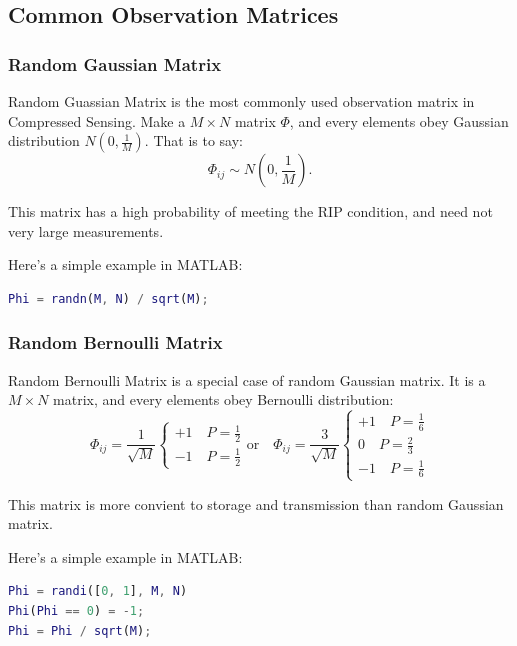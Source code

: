 \documentclass[12pt]{ctexart}
\begin{document}
\subsection{\textbf{Common Observation Matrices}}

\subsubsection{\textbf{Random Gaussian Matrix}}

Random Guassian Matrix is the most commonly used observation matrix in Compressed Sensing.
Make a $M \times N$ matrix $\Phi$, and every elements obey Gaussian distribution
$N (0,\frac{1}{M})$. That is to say:
\[
  \Phi_{ij} \sim N(0, \frac{1}{M}).
\]

This matrix has a high probability of meeting the RIP condition, and need not very large
measurements.

Here's a simple example in MATLAB:

\begin{lstlisting}[language=Matlab]
%% Random Gaussian Matrix Example
Phi = randn(M, N) / sqrt(M);
\end{lstlisting}

\subsubsection{\textbf{Random Bernoulli Matrix}}

Random Bernoulli Matrix is a special case of random Gaussian matrix. It is a $M \times N$
matrix, and every elements obey Bernoulli distribution:
\[
  \Phi_{ij} = \frac{1}{\sqrt{M}}
  \begin{cases}
    +1 \quad P=\tfrac12 \\
    -1 \quad P=\tfrac12
  \end{cases}
  \text{or} \quad
  \Phi_{ij} = \frac{3}{\sqrt{M}}
  \begin{cases}
    +1 \quad P=\tfrac16 \\
    0 \quad P=\tfrac23 \\
    -1 \quad P=\tfrac16
  \end{cases}
\]

This matrix is more convient to storage and transmission than random Gaussian matrix.

Here's a simple example in MATLAB:

\begin{lstlisting}[language=Matlab]
%% Random Bernoulli Matrix Example
Phi = randi([0, 1], M, N)
Phi(Phi == 0) = -1;
Phi = Phi / sqrt(M);
\end{lstlisting}
\end{document}
